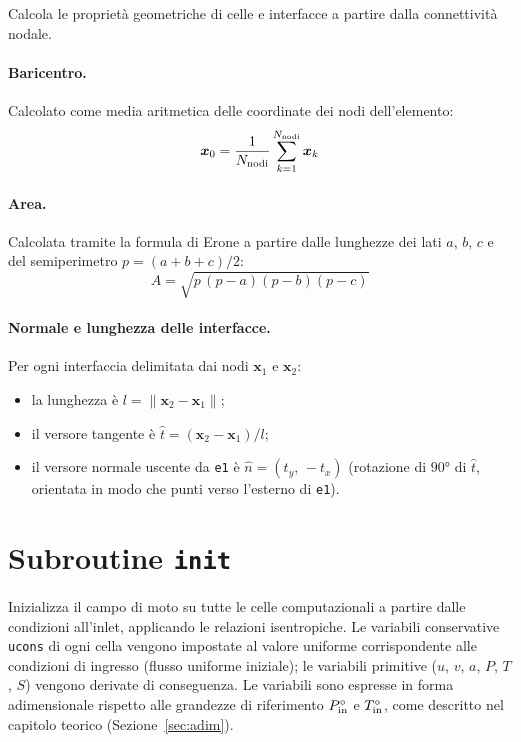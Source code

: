 Calcola le proprietà geometriche di celle e interfacce a partire dalla
connettività nodale.

\paragraph{Baricentro.}
Calcolato come media aritmetica delle coordinate dei nodi dell'elemento:
\[
  \bm{x}_0 = \frac{1}{N_{\rm nodi}} \sum_{k=1}^{N_{\rm nodi}} \bm{x}_k
\]

\paragraph{Area.}
Calcolata tramite la formula di Erone a partire dalle lunghezze dei lati
$a$, $b$, $c$ e del semiperimetro $p = (a+b+c)/2$:
\[
  A = \sqrt{p\,(p-a)(p-b)(p-c)}
\]

\paragraph{Normale e lunghezza delle interfacce.}
Per ogni interfaccia delimitata dai nodi $\bm{x}_1$ e $\bm{x}_2$:
\begin{itemize}
    \item la lunghezza è $l = \|\bm{x}_2 - \bm{x}_1\|$;
    \item il versore tangente è $\hat{t} = (\bm{x}_2 - \bm{x}_1)/l$;
    \item il versore normale uscente da \texttt{e1} è
          $\hat{n} = (t_y,\,-t_x)$ (rotazione di $90°$ di $\hat{t}$,
          orientata in modo che punti verso l'esterno di \texttt{e1}).
\end{itemize}

\section{Subroutine \texttt{init}}

Inizializza il campo di moto su tutte le celle computazionali a partire
dalle condizioni all'inlet, applicando le relazioni isentropiche.
Le variabili conservative \texttt{ucons} di ogni cella vengono impostate
al valore uniforme corrispondente alle condizioni di ingresso (flusso
uniforme iniziale); le variabili primitive ($u$, $v$, $a$, $P$, $T$, $S$)
vengono derivate di conseguenza.
Le variabili sono espresse in forma adimensionale rispetto alle grandezze
di riferimento $P^\circ_{\rm in}$ e $T^\circ_{\rm in}$, come descritto
nel capitolo teorico (Sezione~\ref{sec:adim}).

